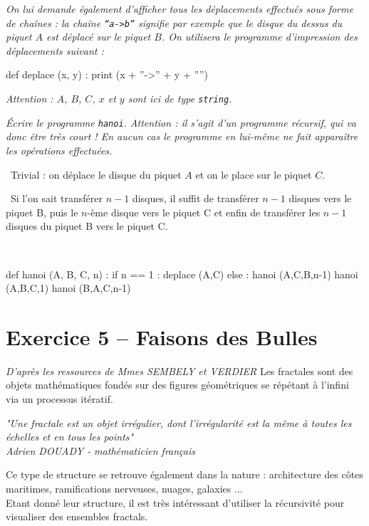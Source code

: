 \textit{On lui demande également d'afficher tous les déplacements effectués sous forme de chaînes : la chaîne 
\texttt{``a->b''} signifie par exemple que le disque du dessus du piquet $A$ est déplacé sur le piquet $B$. On 
utilisera le programme 
d'impression des déplacements suivant :\\}

\begin{python}
def deplace (x, y) :
    print (x + ''->'' + y + ''\n'')
\end{python}

\textit{Attention : $A$, $B$, $C$, $x$ et $y$ sont ici de type \texttt{string}.\\}

\textit{Écrire le programme \texttt{hanoi}. Attention : il s'agit d'un programme récursif, qui va donc être très court 
! En 
aucun cas le programme en lui-même ne fait apparaître les opérations effectuées.}

\ifprof
\begin{corrige}

\question\
Trivial : on déplace le disque du piquet $A$ et on le place sur le piquet $C$.

\question\
Si l'on sait transférer $n-1$ disques, il suffit de
transférer $n-1$ disques vers le piquet B, puis le $n$-ème disque vers le piquet C et enfin de transférer les $n-1$ 
disques du piquet B vers le piquet C.

\question\
\begin{python}
def hanoi (A, B, C, n) :
    if n == 1 :
	deplace (A,C)
    else :
	hanoi (A,C,B,n-1)
	hanoi (A,B,C,1)
	hanoi (B,A,C,n-1)
\end{python}

\setcounter{question}{0}
\end{corrige}
\else
\fi


\section*{Exercice 5 -- Faisons des Bulles}
\setcounter{subparagraph}{0}

\ifprof
\else
\textit{ D'après les ressources de Mmes SEMBELY et VERDIER}
Les fractales sont des objets mathématiques fondés sur des figures géométriques se répétant à l'infini via un processus 
itératif.
\begin{center}
\textit{ "Une fractale est un objet irrégulier, dont l'irrégularité est la même à toutes les échelles et en tous les 
points"
\\
Adrien DOUADY - mathématicien français}
\end{center}
Ce type de structure se retrouve également dans la nature : architecture des côtes maritimes, ramifications nerveuses, 
nuages, galaxies ...
\\
Etant donné leur structure, il est très intéressant d'utiliser la récursivité pour visualiser des ensembles fractals.
\\

